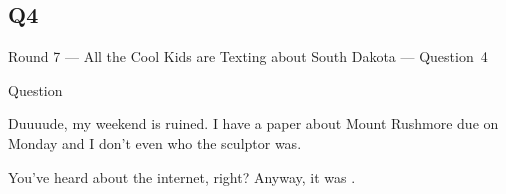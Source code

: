 \documentclass[11pt]{beamer}
\begin{document}
\subsection*{Q4}
\begin{frame}[t]{Round 7 --- All the Cool Kids are Texting about South Dakota --- \mbox{Question 4}}
\begin{block}{Question}

\begin{minipage}{0.9\textwidth}
\begin{mdframed}[
    roundcorner=7pt,
    backgroundcolor=black!5,
    linecolor=black!5,
    fontcolor=black,
    ignorelastdescenders]
\begin{flushleft}
{\small{}\selectfont{}
Duuuude, my weekend is ruined.  I have a paper about Mount Rushmore due on Monday and I don't even who the sculptor was.
}
\end{flushleft}
\end{mdframed}
\end{minipage}

\hfill{}\begin{minipage}{0.9\textwidth}
\begin{mdframed}[
    roundcorner=7pt,
    backgroundcolor=blue!80!white,
    linecolor=blue!80!white,
    fontcolor=white,
    ignorelastdescenders]
\begin{flushleft}
{\small{}\selectfont{}
You've heard about the internet, right? Anyway, it was \textunderscore{}\textunderscore{}\textunderscore{}\textunderscore{}\textunderscore{}\textunderscore{} \textunderscore{}\textunderscore{}\textunderscore{}\textunderscore{}\textunderscore{}\textunderscore{}.
}
\end{flushleft}
\end{mdframed}
\end{minipage}
\end{block}
\end{frame}
\end{document}
